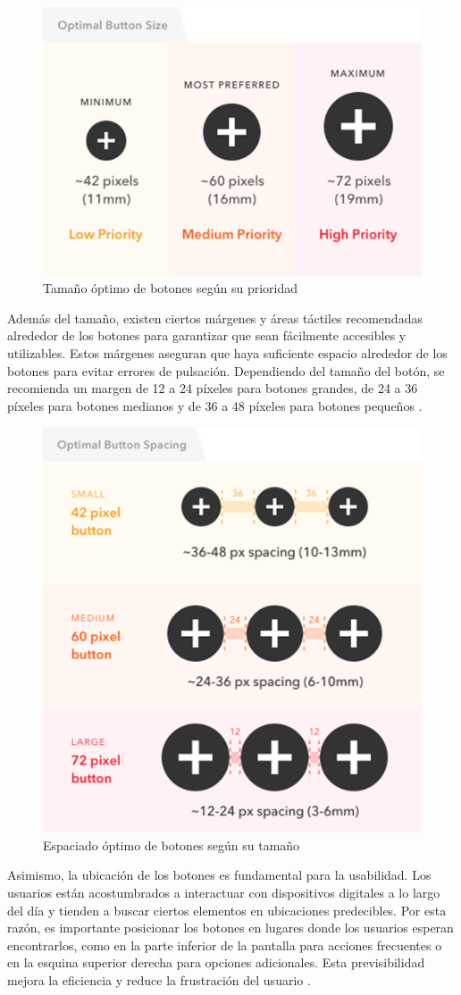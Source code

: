 \begin{figure}[H]
    \centering
    \includegraphics[width=0.6\linewidth]{figuras/optimal_button_size.png}
    \caption{Tamaño óptimo de botones según su prioridad}
    \label{fig:botones_optimos}
\end{figure}

Además del tamaño, existen ciertos márgenes y áreas táctiles recomendadas alrededor de los botones para garantizar que sean fácilmente accesibles y utilizables. Estos márgenes aseguran que haya suficiente espacio alrededor de los botones para evitar errores de pulsación. Dependiendo del tamaño del botón, se recomienda un margen de 12 a 24 píxeles para botones grandes, de 24 a 36 píxeles para botones medianos y de 36 a 48 píxeles para botones pequeños \cite{Anthony2019}. 

\begin{figure} [H]
    \centering
    \includegraphics[width=0.5\linewidth]{figuras/optimal_space_buttons.png}
    \caption{Espaciado óptimo de botones según su tamaño}
    \label{fig:esapcio_optimo}
\end{figure}

Asimismo, la ubicación de los botones es fundamental para la usabilidad. Los usuarios están acostumbrados a interactuar con dispositivos digitales a lo largo del día y tienden a buscar ciertos elementos en ubicaciones predecibles. Por esta razón, es importante posicionar los botones en lugares donde los usuarios esperan encontrarlos, como en la parte inferior de la pantalla para acciones frecuentes o en la esquina superior derecha para opciones adicionales. Esta previsibilidad mejora la eficiencia y reduce la frustración del usuario \cite{Pickaso2022}.


